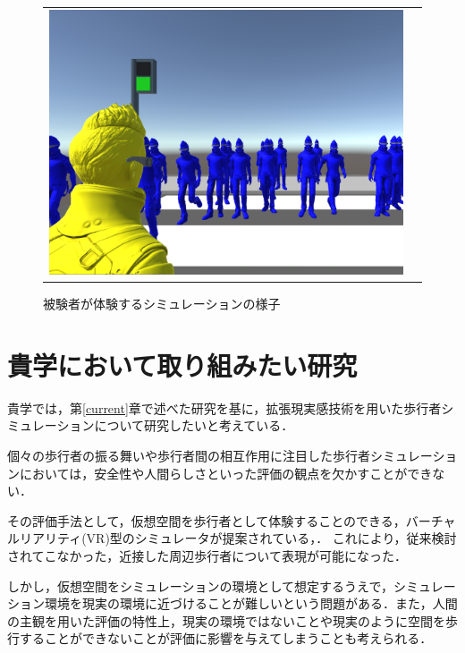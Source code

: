 \documentclass[twocolumn]{jarticle}%
\begin{document}
\begin{figure}[H]
\begin{tabular}{cc}
\begin{minipage}[t]{0.45\hsize}
        \includegraphics[keepaspectratio, scale=0.1]{images/user_view_mini.JPG}
        \caption{被験者が体験するシミュレーションの様子}
        \label{fig:user_view}
      \end{minipage}
    \end{tabular}
  \end{figure}

\vspace{-2mm}
\section{貴学において取り組みたい研究}\label{want}
\thispagestyle{fancy}
貴学では，第\ref{current}章で述べた研究を基に，拡張現実感技術を用いた歩行者シミュレーションについて研究したいと考えている．

個々の歩行者の振る舞いや歩行者間の相互作用に注目した歩行者シミュレーションにおいては，安全性や人間らしさといった評価の観点を欠かすことができない．

その評価手法として，仮想空間を歩行者として体験することのできる，バーチャルリアリティ(VR)型のシミュレータが提案されている\cite{Iryo-VRE}，\cite{Iryo-Appli}．
これにより，従来検討されてこなかった，近接した周辺歩行者について表現が可能になった．

しかし，仮想空間をシミュレーションの環境として想定するうえで，シミュレーション環境を現実の環境に近づけることが難しいという問題がある．また，人間の主観を用いた評価の特性上，現実の環境ではないことや現実のように空間を歩行することができないことが評価に影響を与えてしまうことも考えられる．
\end{document}
